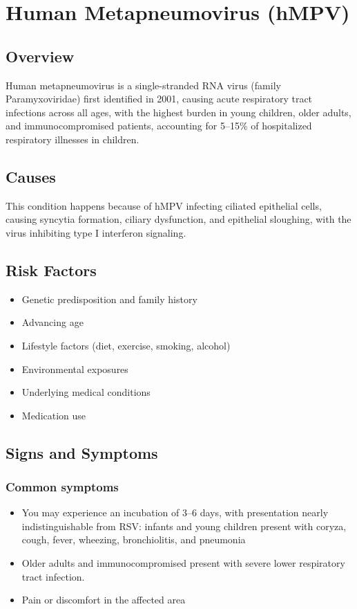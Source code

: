 \chapter{Human Metapneumovirus (hMPV)}
\label{sec:Human Metapneumovirus}

\section{Overview}
Human metapneumovirus is a single-stranded RNA virus (family Paramyxoviridae) first identified in 2001, causing acute respiratory tract infections across all ages, with the highest burden in young children, older adults, and immunocompromised patients, accounting for 5--15\% of hospitalized respiratory illnesses in children.
\section{Causes}
This condition happens because of hMPV infecting ciliated epithelial cells, causing syncytia formation, ciliary dysfunction, and epithelial sloughing, with the virus inhibiting type I interferon signaling.     
\section{Risk Factors}

\begin{itemize}[noitemsep]
  \item Genetic predisposition and family history
  \item Advancing age
  \item Lifestyle factors (diet, exercise, smoking, alcohol)
  \item Environmental exposures
  \item Underlying medical conditions
  \item Medication use
\end{itemize}
\section{Signs and Symptoms}

\subsection{Common symptoms}
\begin{itemize}[noitemsep]
  \item You may experience an incubation of 3--6 days, with presentation nearly indistinguishable from RSV: infants and young children present with coryza, cough, fever, wheezing, bronchiolitis, and pneumonia
  \item Older adults and immunocompromised present with severe lower respiratory tract infection.
  \item Pain or discomfort in the affected area
  \end{itemize}

